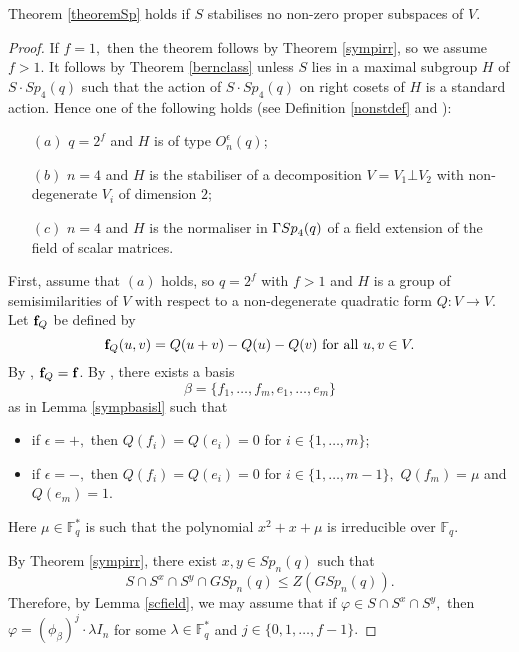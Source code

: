 \begin{Th}
\label{SpSirr41}
Theorem {\rm \ref{theoremSp}} holds if $S$ stabilises no non-zero proper subspaces of $V$.
\end{Th}
\begin{proof}
If $f=1,$ then the theorem follows by Theorem \ref{sympirr}, so we assume $f>1.$ It follows by Theorem \ref{bernclass} unless  $S$ lies in a maximal subgroup $H$ of $S \cdot Sp_4(q)$ such that the action of $S \cdot Sp_4(q)$ on right cosets of $H$ is a standard action. Hence one of the following holds (see Definition \ref{nonstdef} and \cite[Table 1]{burness}):
\begin{itemize}
 \item[$(a)$] $q=2^f$ and $H$ is of type $O_n^{\epsilon}(q)$;
\item[$(b)$] $n=4$ and $H$ is the stabiliser of a decomposition $V= V_1 \bot V_2$ with non-degenerate $V_i$ of dimension $2$;
\item[$(c)$] $n=4$ and $H$ is the normaliser in ${{\Gamma Sp}}_4(q)$ of a field extension of the field of scalar matrices.  
\end{itemize}

 First, assume that $(a)$ holds, so $q=2^f$ with $f>1$ and $H$ is a group of semisimilarities of $V$ with respect to a non-degenerate quadratic form $Q:V \to V.$ Let ${\bf f}_{Q}$ be defined by 
\begin{equation}
\label{fpolarQ}
{\bf f}_{Q}(u,v)=Q(u + v) - Q(u) - Q(v) \text{ for all } u,v \in V.
\end{equation}  By \cite[Table 4.8.A]{kleidlieb}, ${\bf f}_{Q}={\bf f}$. By \cite[Proposition 2.5.3]{kleidlieb},  there exists a basis 
$$\beta = \{f_1, \ldots, f_m, e_1, \ldots, e_m\}$$ as in Lemma \ref{sympbasisl} such that
\begin{itemize}
\item if $\epsilon=+,$ then $Q(f_i)=Q(e_i)=0$ for $i \in \{1, \ldots, m\}$;
\item if $\epsilon=-,$ then $Q(f_i)=Q(e_i)=0$ for $i \in \{1, \ldots, m-1\},$ $Q(f_m)=\mu$ and $Q(e_m)=1$.
\end{itemize}
Here $\mu \in \mathbb{F}_q^*$ is such that the polynomial $x^2+x+ \mu$ is irreducible over $\mathbb{F}_q.$ 

By Theorem \ref{sympirr}, there exist $x,y \in Sp_n(q)$ such that 
$$S \cap S^x \cap S^y \cap GSp_n(q) \le Z(GSp_n(q)).$$
Therefore, by Lemma \ref{scfield}, we may assume that if $\varphi \in S \cap S^x \cap S^y,$ then $\varphi= (\phi_{\beta})^j \cdot \lambda I_n$ for some $\lambda \in \mathbb{F}_q^*$ and $j \in \{0,1, \ldots, f-1\}.$


\end{proof}
